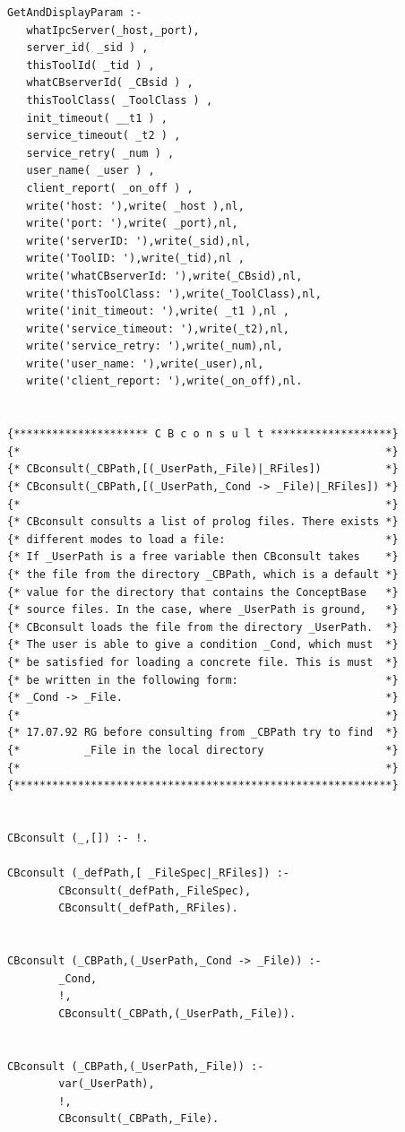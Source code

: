 \begin{verbatim}
GetAndDisplayParam :- 
   whatIpcServer(_host,_port), 
   server_id( _sid ) , 
   thisToolId( _tid ) , 
   whatCBserverId( _CBsid ) , 
   thisToolClass( _ToolClass ) ,
   init_timeout( __t1 ) , 
   service_timeout( _t2 ) , 
   service_retry( _num ) , 
   user_name( _user ) , 
   client_report( _on_off ) ,
   write('host: '),write( _host ),nl, 
   write('port: '),write( _port),nl, 
   write('serverID: '),write(_sid),nl, 
   write('ToolID: '),write(_tid),nl , 
   write('whatCBserverId: '),write(_CBsid),nl, 
   write('thisToolClass: '),write(_ToolClass),nl, 
   write('init_timeout: '),write( _t1 ),nl , 
   write('service_timeout: '),write(_t2),nl, 
   write('service_retry: '),write(_num),nl, 
   write('user_name: '),write(_user),nl, 
   write('client_report: '),write(_on_off),nl.


{********************* C B c o n s u l t *******************}
{*                                                         *}
{* CBconsult(_CBPath,[(_UserPath,_File)|_RFiles])          *}
{* CBconsult(_CBPath,[(_UserPath,_Cond -> _File)|_RFiles]) *}
{*                                                         *}
{* CBconsult consults a list of prolog files. There exists *}
{* different modes to load a file:                         *}
{* If _UserPath is a free variable then CBconsult takes    *}
{* the file from the directory _CBPath, which is a default *}
{* value for the directory that contains the ConceptBase   *}
{* source files. In the case, where _UserPath is ground,   *}
{* CBconsult loads the file from the directory _UserPath.  *}
{* The user is able to give a condition _Cond, which must  *}
{* be satisfied for loading a concrete file. This is must  *}
{* be written in the following form:                       *}
{* _Cond -> _File.                                         *}
{*                                                         *}
{* 17.07.92 RG before consulting from _CBPath try to find  *}
{*          _File in the local directory                   *}
{*                                                         *}
{***********************************************************}


CBconsult (_,[]) :- !.

CBconsult (_defPath,[ _FileSpec|_RFiles]) :-
        CBconsult(_defPath,_FileSpec),
        CBconsult(_defPath,_RFiles).


CBconsult (_CBPath,(_UserPath,_Cond -> _File)) :-
        _Cond,
        !,
        CBconsult(_CBPath,(_UserPath,_File)).


CBconsult (_CBPath,(_UserPath,_File)) :-
        var(_UserPath),
        !,
        CBconsult(_CBPath,_File).


\end{verbatim}
